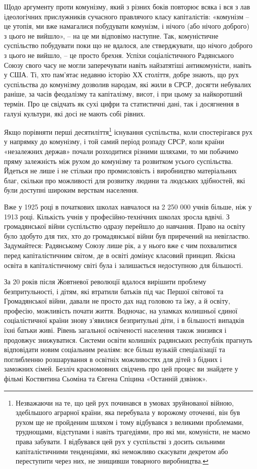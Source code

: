 \documentclass[../main]{subfiles}
\begin{document}
Щодо аргументу проти комунізму, який з різних боків повторює всяка і вся з лав ідеологічних прислужників сучасного правлячого класу капіталістів: «комунізм – це утопія, ми вже намагалися побудувати комунізм, і нічого (або нічого доброго) з цього не вийшло», – на це ми відповімо наступне. Так, комуністичне суспільство побудувати поки що не вдалося, але стверджувати, що нічого доброго з цього не вийшло, – це просто брехня. Успіхи соціалістичного Радянського Союзу свого часу не могли заперечувати навіть найзатятіші антикомуністи, навіть у США. Ті, хто пам’ятає недавню історію ХХ століття, добре знають, що рух суспільства до комунізму дозволив народам, які жили в СРСР, досягти небувалих раніше, за часів феодалізму та капіталізму, висот, і при цьому за найкоротший термін. Про це свідчать як сухі цифри та статистичні дані, так і досягнення в галузі культури, які досі не мають собі рівних.

Якщо порівняти перші десятиліття\footnote{Незважаючи на те, що цей рух починався в умовах зруйнованої війною, здебільшого аграрної країни, яка перебувала у ворожому оточенні, він був рухом ще не пройденим шляхом і тому відбувався з великими проблемами, труднощами, відступами і навіть трагедіями, про які ми, комуністи, не маємо права забувати. І відбувався цей рух у суспільстві з досить сильними капіталістичними тенденціями, які неможливо скасувати декретом або переступити через них, не знищивши товарного виробництва.} існування суспільства, коли спостерігався рух у напрямку до комунізму, і той самий період розпаду СРСР, коли країни «незалежних держав» почали розходитися різними шляхами, то ми побачимо пряму залежність між рухом до комунізму та розвитком усього суспільства. Йдеться не лише і не стільки про промисловість і виробництво матеріальних благ, скільки про можливості для розвитку людини та людських здібностей, які були доступні широким верствам населення.

Вже у 1925 році в початкових школах навчалося на 2 250 000 учнів більше, ніж у 1913 році. Кількість учнів у професійно-технічних школах зросла вдвічі. З громадянської війни суспільство одразу перейшло до навчання. Право на освіту було здобуто для тих, хто до громадянської війни був приречений на невігластво. Задумайтеся: Радянському Союзу лише рік, а у нього вже є чим похвалитися перед капіталістичним світом, де в освіті домінує класовий принцип. Якісна освіта в капіталістичному світі була і залишається недоступною для більшості.

За 20 років після Жовтневої революції вдалося вирішити проблему безпритульності, і дітям, які втратили батьків під час Першої світової та Громадянської війни, давали не просто дах над головою та їжу, а й освіту, професію, можливість почати життя. Водночас, на уламках колишньої єдиної соціалістичної країни знову з’явилися безпритульні діти, і в більшості випадків їхні батьки живі. Рівень загальної освіченості населення також знизився і продовжує знижуватися. Системи освіти колишніх радянських республік прагнуть відповідати новим соціальним реаліям: все більш вузькій спеціалізації та поглибленню розшарування в освітніх можливостях для дітей з бідних і заможних сімей. Безліч красномовних свідчень про цей процес ви знайдете у фільмі Костянтина Сьоміна та Євгена Спіцина «Останній дзвінок».
\end{document}
